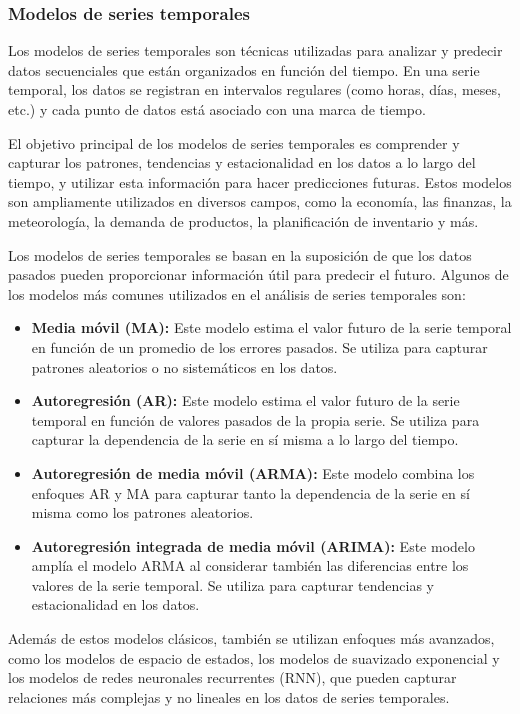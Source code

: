 \subsubsection{Modelos de series temporales}
Los modelos de series temporales son técnicas utilizadas para analizar y predecir datos secuenciales que están organizados en función del tiempo. En una serie temporal, los datos se registran en intervalos regulares (como horas, días, meses, etc.) y cada punto de datos está asociado con una marca de tiempo.

El objetivo principal de los modelos de series temporales es comprender y capturar los patrones, tendencias y estacionalidad en los datos a lo largo del tiempo, y utilizar esta información para hacer predicciones futuras. Estos modelos son ampliamente utilizados en diversos campos, como la economía, las finanzas, la meteorología, la demanda de productos, la planificación de inventario y más.

Los modelos de series temporales se basan en la suposición de que los datos pasados pueden proporcionar información útil para predecir el futuro. Algunos de los modelos más comunes utilizados en el análisis de series temporales son:
\begin{itemize}
    \item \textbf{Media móvil (MA):} Este modelo estima el valor futuro de la serie temporal en función de un promedio de los errores pasados. Se utiliza para capturar patrones aleatorios o no sistemáticos en los datos.
    \item \textbf{Autoregresión (AR):} Este modelo estima el valor futuro de la serie temporal en función de valores pasados de la propia serie. Se utiliza para capturar la dependencia de la serie en sí misma a lo largo del tiempo.
    \item \textbf{Autoregresión de media móvil (ARMA):} Este modelo combina los enfoques AR y MA para capturar tanto la dependencia de la serie en sí misma como los patrones aleatorios.
    \item \textbf{Autoregresión integrada de media móvil (ARIMA):} Este modelo amplía el modelo ARMA al considerar también las diferencias entre los valores de la serie temporal. Se utiliza para capturar tendencias y estacionalidad en los datos.
\end{itemize}

Además de estos modelos clásicos, también se utilizan enfoques más avanzados, como los modelos de espacio de estados, los modelos de suavizado exponencial y los modelos de redes neuronales recurrentes (RNN), que pueden capturar relaciones más complejas y no lineales en los datos de series temporales.

